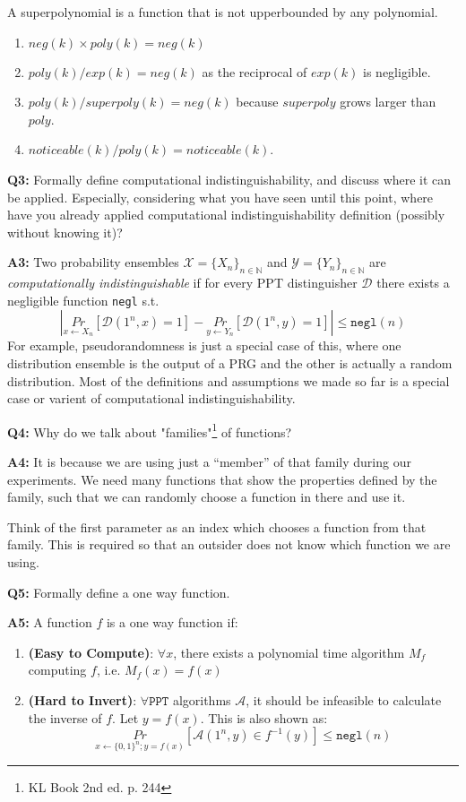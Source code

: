 \documentclass[12pt,reqno]{amsart}
\newcommand{\code}[1]{\texttt{#1}}
\newcommand{\advrs}[0]{\mathcal{A}}
\newcommand{\distin}[0]{\mathcal{D}}
\begin{document}
  A superpolynomial is a function that is not upperbounded by any polynomial.
\begin{enumerate}[label=\alph*.]
 \item $neg(k) \times poly(k) = neg(k)$
 \item $poly(k) / exp(k) = neg(k)$ as the reciprocal of $exp(k)$ is negligible.
 \item $poly(k) / superpoly(k) = neg(k)$ because $superpoly$ grows larger than $poly$.
 \item $noticeable(k) / poly(k) = noticeable(k)$.
\end{enumerate} 

\vspace{20px}
\textbf{Q3:} Formally define computational indistinguishability, and discuss where it can be applied. Especially, considering what you have seen until this point, where have you already applied computational indistinguishability definition (possibly without knowing it)?

\textbf{A3:} Two probability ensembles $\mathcal{X} = \{X_n\}_{n \in \mathbb{N}}$ and  $\mathcal{Y} = \{Y_n\}_{n \in \mathbb{N}}$ are \textit{computationally indistinguishable} if for every PPT distinguisher $\distin$ there exists a negligible function \code{negl} s.t.
$$
\left| \underset{x \xleftarrow{} X_n}{Pr}[\distin(1^n, x) = 1] - \underset{y \xleftarrow{} Y_n}{Pr}[\distin(1^n, y) = 1]\right| \leq \code{negl}(n)
$$
For example, pseudorandomness is just a special case of this, where one distribution ensemble is the output of a PRG and the other is actually a random distribution. Most of the definitions and assumptions we made so far is a special case or varient of computational indistinguishability.

\vspace{20px}
\textbf{Q4:} Why do we talk about "families"\footnote{KL Book 2nd ed. p. 244} of functions?

\textbf{A4:} It is because we are using just a ``member'' of that family during our experiments. We need many functions that show the properties defined by the family, such that we can randomly choose a function in there and use it.

Think of the first parameter as an index which chooses a function from that family. This is required so that an outsider does not know which function we are using.

\vspace{20px}
\textbf{Q5:} Formally define a one way function.

\textbf{A5:} A function $f$ is a one way function if:
\begin{enumerate}
	\item \textbf{(Easy to Compute)}: $\forall x$, there exists a polynomial time algorithm $M_f$ computing $f$, i.e. $M_f(x) = f(x)$
	\item \textbf{(Hard to Invert)}: $\forall \code{PPT}$ algorithms $\advrs$, it should be infeasible to calculate the inverse of $f$. Let $y=f(x)$. This is also shown as:
	$$
	\underset{x \xleftarrow{} \{0,1\}^n; y = f(x)}{Pr}[\advrs(1^n, y) \in f^{-1}(y)] \leq \code{negl}(n)
	$$ 
\end{enumerate}
\end{document}
